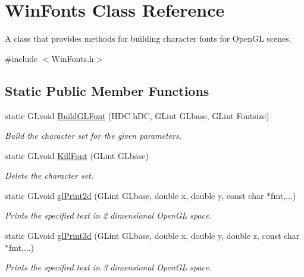 \hypertarget{class_win_fonts}{
\section{WinFonts Class Reference}
\label{class_win_fonts}
}


A class that provides methods for building character fonts for OpenGL scenes.  




{\ttfamily \#include $<$WinFonts.h$>$}

\subsection*{Static Public Member Functions}
\begin{DoxyCompactItemize}
\item 
static GLvoid \hyperlink{class_win_fonts_ac9458d16ce74fce9db04ecaca5d6eba5}{BuildGLFont} (HDC hDC, GLint GLbase, GLint Fontsize)
\begin{DoxyCompactList}\small\item\em Build the character set for the given parameters. \end{DoxyCompactList}\item 
static GLvoid \hyperlink{class_win_fonts_a4bd901543b5de096baedb9062fbe931c}{KillFont} (GLint GLbase)
\begin{DoxyCompactList}\small\item\em Delete the character set. \end{DoxyCompactList}\item 
static GLvoid \hyperlink{class_win_fonts_a57c22391965f60ee410b29dfd583578c}{glPrint2d} (GLint GLbase, double x, double y, const char $\ast$fmt,...)
\begin{DoxyCompactList}\small\item\em Prints the specified text in 2 dimensional OpenGL space. \end{DoxyCompactList}\item 
static GLvoid \hyperlink{class_win_fonts_ac6df7d32302f883f39c5ca841f5a748e}{glPrint3d} (GLint GLbase, double x, double y, double z, const char $\ast$fmt,...)
\begin{DoxyCompactList}\small\item\em Prints the specified text in 3 dimensional OpenGL space. \end{DoxyCompactList}\end{DoxyCompactItemize}
